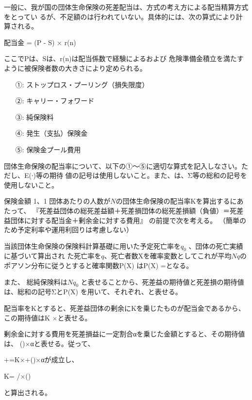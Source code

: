 \documentclass[report,gutter=10mm,fore-edge=10mm,uplatex,dvipdfmx]{jlreq}
\begin{document}
一般に、我が国の団体生命保険の死差配当は、方式の考え方による配当精算方式をとってい
るが、不足額のは行われていない。具体的には、次の算式により計算される。

配当金 = (P - S) × r(n)

ここでPは、Sは、r(n)は配当係数で経験によるおよび
危険準備金積立を満たすように被保険者数の大きさにより定められる。

\answer{}

\begin{itemize}
\item[ ①: ] ストップロス・プーリング（損失限度）
\item[ ②: ] キャリー・フォワード
\item[ ③: ] 純保険料
\item[ ④: ] 発生（支払）保険金
\item[ ⑤: ] 保険金プール費用
\end{itemize}

団体生命保険の配当率について、以下の①～⑤に適切な算式を記入しなさい。ただし、E(∙)等の期待
値の記号は使用しないこと。また、は、Σ等の総和の記号を使用しないこと。

保険金額 1、1 団体あたりの人数が$N$の団体生命保険の配当率Kを算出するにあたって、
『死差益団体の総死差益額＋死差損団体の総死差損額（負値）＝死差益団体に対する配当金＋剰余金に対する費用』
の前提で次を考える。
（簡単のため予定利率や運用利回りは考慮しない）

当該団体生命保険の保険料計算基礎に用いた予定死亡率を$q_0$ 、団体の死亡実績に基づいて算出され
た死亡率を$q$、死亡者数Xを確率変数としてこれが平均$Nq$のポアソン分布に従うとすると確率関数P(X)
はP(X) =となる。

また、
総純保険料は$Nq_0$ と表せることから、死差益の期待値と死差損の期待値は、総和の記号ΣとP(X)
を用いて、それぞれ、と表せる。

配当率をKとすると、死差益団体の剰余にKを乗じたものが配当金であるから、
この期待値はK ×と表せる。

剰余金に対する費用を死差損益に一定割合αを乗じた金額とすると、その期待値は、
()×αと表せる。従って、

+=K×+()×αが成立し、

K= /×()

と算出される。

\answer{}
\end{document}
